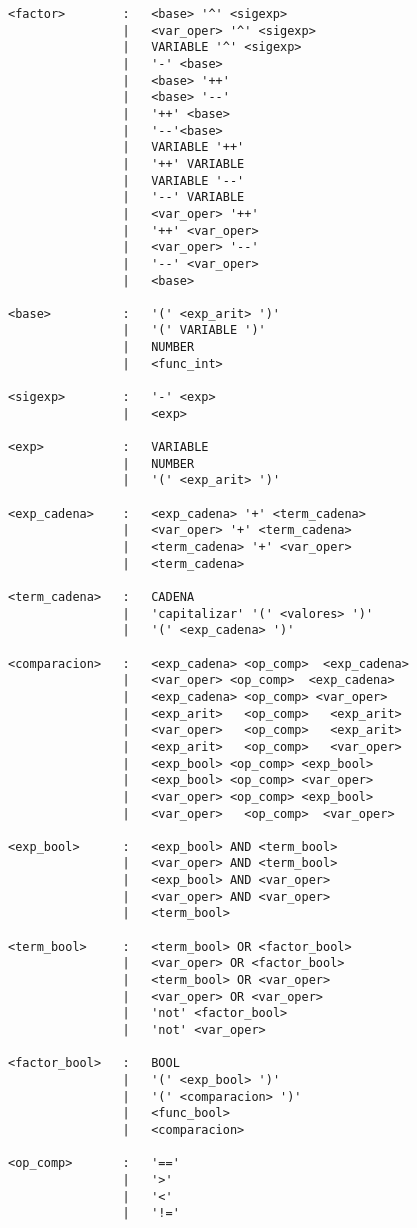 \begin{verbatim}
<factor>        :   <base> '^' <sigexp>
                |   <var_oper> '^' <sigexp>
                |   VARIABLE '^' <sigexp>
                |   '-' <base>  
                |   <base> '++'
                |   <base> '--'
                |   '++' <base>
                |   '--'<base>
                |   VARIABLE '++'
                |   '++' VARIABLE
                |   VARIABLE '--'
                |   '--' VARIABLE
                |   <var_oper> '++'
                |   '++' <var_oper>
                |   <var_oper> '--'
                |   '--' <var_oper>
                |   <base>

<base>          :   '(' <exp_arit> ')'
                |   '(' VARIABLE ')'
                |   NUMBER
                |   <func_int>

<sigexp>        :   '-' <exp>
                |   <exp>

<exp>           :   VARIABLE
                |   NUMBER
                |   '(' <exp_arit> ')'

<exp_cadena>    :   <exp_cadena> '+' <term_cadena>
                |   <var_oper> '+' <term_cadena>
                |   <term_cadena> '+' <var_oper> 
                |   <term_cadena> 

<term_cadena>   :   CADENA
                |   'capitalizar' '(' <valores> ')'
                |   '(' <exp_cadena> ')'

<comparacion>   :   <exp_cadena> <op_comp>  <exp_cadena>
                |   <var_oper> <op_comp>  <exp_cadena>
                |   <exp_cadena> <op_comp> <var_oper> 
                |   <exp_arit>   <op_comp>   <exp_arit>
                |   <var_oper>   <op_comp>   <exp_arit>
                |   <exp_arit>   <op_comp>   <var_oper>
                |   <exp_bool> <op_comp> <exp_bool>
                |   <exp_bool> <op_comp> <var_oper>
                |   <var_oper> <op_comp> <exp_bool>
                |   <var_oper>   <op_comp>  <var_oper> 

<exp_bool>      :   <exp_bool> AND <term_bool>
                |   <var_oper> AND <term_bool>
                |   <exp_bool> AND <var_oper>
                |   <var_oper> AND <var_oper>
                |   <term_bool>

<term_bool>     :   <term_bool> OR <factor_bool>
                |   <var_oper> OR <factor_bool>
                |   <term_bool> OR <var_oper>
                |   <var_oper> OR <var_oper>
                |   'not' <factor_bool>
                |   'not' <var_oper>

<factor_bool>   :   BOOL
                |   '(' <exp_bool> ')'
                |   '(' <comparacion> ')'
                |   <func_bool>
                |   <comparacion>

<op_comp>       :   '=='
                |   '>'
                |   '<'
                |   '!='


    
\end{verbatim}
